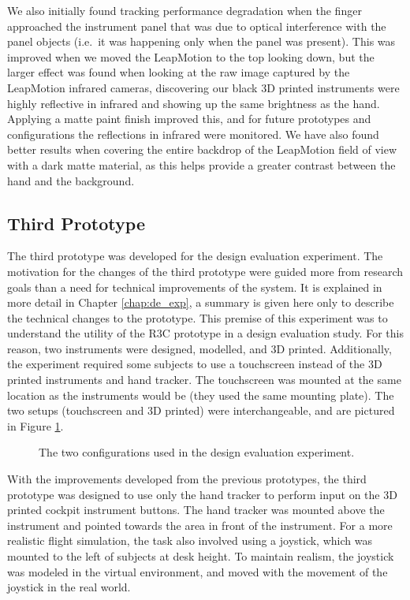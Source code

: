 We also initially found tracking performance degradation when the finger approached the instrument panel that was due to optical interference with the panel objects (i.e.\ it was happening only when the panel was present).
This was improved when we moved the LeapMotion to the top looking down, but the larger effect was found when looking at the raw image captured by the LeapMotion infrared cameras, discovering our black 3D printed instruments were highly reflective in infrared and showing up the same brightness as the hand.
Applying a matte paint finish improved this, and for future prototypes and configurations the reflections in infrared were monitored.
We have also found better results when covering the entire backdrop of the LeapMotion field of view with a dark matte material, as this helps provide a greater contrast between the hand and the background.


\subsection{Third Prototype}

The third prototype was developed for the design evaluation experiment.
The motivation for the changes of the third prototype were guided more from research goals than a need for technical improvements of the system.
It is explained in more detail in Chapter \ref{chap:de_exp}, a summary is given here only to describe the technical changes to the prototype.
This premise of this experiment was to understand the utility of the R3C prototype in a design evaluation study.
For this reason, two instruments were designed, modelled, and 3D printed.
Additionally, the experiment required some subjects to use a touchscreen instead of the 3D printed instruments and hand tracker.
The touchscreen was mounted at the same location as the instruments would be (they used the same mounting plate).
The two setups (touchscreen and 3D printed) were interchangeable, and are pictured in Figure \ref{fig:proto_design_exp}.

\begin{figure}
    \centering
    \caption{The two configurations used in the design evaluation experiment.}
    \label{fig:proto_design_exp}
\end{figure}

With the improvements developed from the previous prototypes, the third prototype was designed to use only the hand tracker to perform input on the 3D printed cockpit instrument buttons.
The hand tracker was mounted above the instrument and pointed towards the area in front of the instrument.
For a more realistic flight simulation, the task also involved using a joystick, which was mounted to the left of subjects at desk height.
To maintain realism, the joystick was modeled in the virtual environment, and moved with the movement of the joystick in the real world.

